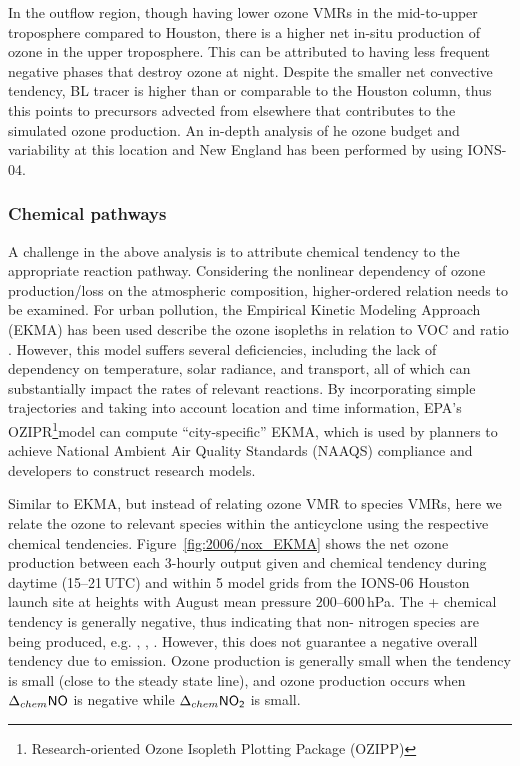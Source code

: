 In the outflow region, though having lower ozone VMRs in the mid-to-upper troposphere compared to Houston, there is a higher net in-situ production of
ozone in the upper troposphere. This can be attributed to having less frequent negative phases that destroy ozone at night. Despite the smaller net
convective tendency, BL tracer is higher than or comparable to the Houston column, thus this points to precursors advected from elsewhere that
contributes to the simulated ozone production. An in-depth analysis of he ozone budget and variability at this location and New England has been
performed by \citet{Thompson:2007gd,Thompson:2007ov} using IONS-04.

\subsubsection{Chemical pathways}

A challenge in the above analysis is to attribute chemical tendency to the appropriate reaction pathway. Considering the nonlinear dependency of ozone
production/loss on the atmospheric composition, higher-ordered relation needs to be examined. For urban pollution, the Empirical Kinetic Modeling
Approach (EKMA) has been used describe the ozone isopleths in relation to VOC and  ratio \citep{Dimitriades:1977fk}. However, this model
suffers several deficiencies, including the lack of dependency on temperature, solar radiance, and transport, all of which can substantially impact the
rates of relevant reactions. By incorporating simple trajectories and taking into account location and time information, EPA's OZIPR\footnote{Research-oriented
Ozone Isopleth Plotting Package (OZIPP)}model can compute ``city-specific'' EKMA, which is used by planners to achieve National Ambient Air Quality
Standards (NAAQS) compliance and developers to construct research models.


Similar to EKMA, but instead of relating ozone VMR to species VMRs, here we relate the ozone to relevant species within the anticyclone using the respective
chemical tendencies. Figure~\ref{fig:2006/nox_EKMA} shows the net ozone production between each 3-hourly output given  and 
chemical tendency during daytime (15--21\,\unit{UTC}) and within 5 model grids from the IONS-06 Houston launch site at heights with August mean pressure
200--600\,\unit{hPa}. The + chemical tendency is generally negative, thus indicating that non- nitrogen species are being
produced, e.g. , , . However, this does not guarantee a negative overall  tendency due to {\lnox} emission.
Ozone production is generally small when the  tendency is small (close to the steady state line), and ozone production occurs when 
$\Delta_{chem}\chem{NO}$ is negative while $\Delta_{chem}\chem{NO_2}$ is small.

